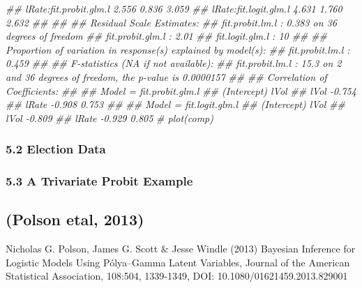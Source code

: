 \documentclass[
]{article}
\newenvironment{Shaded}{\begin{snugshade}}{\end{snugshade}}
\newcommand{\CommentTok}[1]{\textcolor[rgb]{0.56,0.35,0.01}{\textit{#1}}}
\begin{document}
\begin{Shaded}
\begin{Highlighting}[]
\CommentTok{## lRate:fit.probit.glm.l        2.556    0.836      3.059 }
\CommentTok{## lRate:fit.logit.glm.l         4.631    1.760      2.632 }
\CommentTok{## }
\CommentTok{## }
\CommentTok{## Residual Scale Estimates:}
\CommentTok{## fit.probit.lm.l  : 0.383 on 36 degrees of freedom}
\CommentTok{## fit.probit.glm.l : 2.01 }
\CommentTok{## fit.logit.glm.l  : 10 }
\CommentTok{## }
\CommentTok{## Proportion of variation in response(s) explained by model(s):}
\CommentTok{## fit.probit.lm.l  : 0.459 }
\CommentTok{## }
\CommentTok{## F-statistics (NA if not available):}
\CommentTok{## fit.probit.lm.l  : 15.3 on 2 and 36 degrees of freedom, the  p-value is 0.0000157 }
\CommentTok{## }
\CommentTok{## Correlation of Coefficients:}
\CommentTok{## }
\CommentTok{## Model =  fit.probit.glm.l }
\CommentTok{##       (Intercept) lVol  }
\CommentTok{## lVol  -0.754            }
\CommentTok{## lRate -0.908       0.753}
\CommentTok{## }
\CommentTok{## Model =  fit.logit.glm.l  }
\CommentTok{##       (Intercept) lVol  }
\CommentTok{## lVol  -0.809            }
\CommentTok{## lRate -0.929       0.805}
\CommentTok{# plot(comp)}
\end{Highlighting}
\end{Shaded}

\hypertarget{election-data}{%
\subsubsection{5.2 Election Data}\label{election-data}}

\hypertarget{a-trivariate-probit-example}{%
\subsubsection{5.3 A Trivariate Probit
Example}\label{a-trivariate-probit-example}}

\hypertarget{polson-etal-2013}{%
\subsection{(Polson etal, 2013)}\label{polson-etal-2013}}

Nicholas G. Polson, James G. Scott \& Jesse Windle (2013) Bayesian
Inference for Logistic Models Using Pólya--Gamma Latent Variables,
Journal of the American Statistical Association, 108:504, 1339-1349,
DOI: 10.1080/01621459.2013.829001
\end{document}
